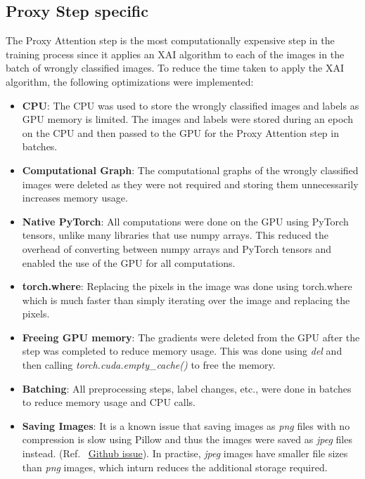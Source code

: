 \subsection{Proxy Step specific}
The Proxy Attention step is the most computationally expensive step in the training process since it applies an XAI algorithm to each of the images in the batch of wrongly classified images. To reduce the time taken to apply the XAI algorithm, the following optimizations were implemented:
\begin{itemize}
    \item \textbf{CPU}: The CPU was used to store the wrongly classified images and labels as GPU memory is limited. The images and labels were stored during an epoch on the CPU and then passed to the GPU for the Proxy Attention step in batches.
    \item \textbf{Computational Graph}: The computational graphs of the wrongly classified images were deleted as they were not required and storing them unnecessarily increases memory usage.
    \item \textbf{Native PyTorch}: All computations were done on the GPU using PyTorch tensors, unlike many libraries that use numpy arrays. This reduced the overhead of converting between numpy arrays and PyTorch tensors and enabled the use of the GPU for all computations.
    \item \textbf{torch.where}: Replacing the pixels in the image was done using torch.where which is much faster than simply iterating over the image and replacing the pixels.
    \item \textbf{Freeing GPU memory}: The gradients were deleted from the GPU after the step was completed to reduce memory usage. This was done using \textit{del} and then calling \textit{torch.cuda.empty\_cache()} to free the memory.
    \item \textbf{Batching}: All preprocessing steps, label changes, etc., were done in batches to reduce memory usage and CPU calls.
    \item \textbf{Saving Images}: It is a known issue that saving images as \textit{png} files with no compression is slow using Pillow and thus the images were saved as \textit{jpeg} files instead. (Ref. ~\href{https://github.com/python-pillow/Pillow/issues/1211}{Github issue}). In practise, \textit{jpeg} images have smaller file sizes than \textit{png} images, which inturn reduces the additional storage required.

\end{itemize}

